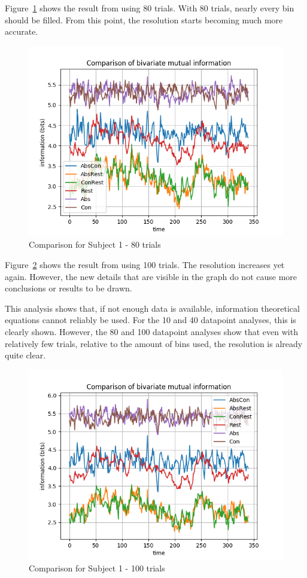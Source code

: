 Figure~\ref{80-trials} shows the result from using 80 trials. With 80 trials, nearly every bin should be filled. From this point, the resolution starts becoming much more accurate. 

\begin{figure}[!htb]
\caption{Comparison for Subject 1 - 80 trials}
\label{80-trials}
    \centering
    \includegraphics[width=\textwidth]{fig/subject1_80trials_all-channel-1}
\end{figure}

Figure~\ref{100-trials} shows the result from using 100 trials. The resolution increases yet again. However, the new details that are visible in the graph do not cause more conclusions or results to be drawn. 

This analysis shows that, if not enough data is available, information theoretical equations cannot reliably be used. For the 10 and 40 datapoint analyses, this is clearly shown. However, the 80 and 100 datapoint analyses show that even with relatively few trials, relative to the amount of bins used, the resolution is already quite clear.

\begin{figure}[!htb]
\caption{Comparison for Subject 1 - 100 trials}
\label{100-trials}
    \centering
    \includegraphics[width=\textwidth]{fig/subject1_100trials_all-channel-1}
\end{figure}

